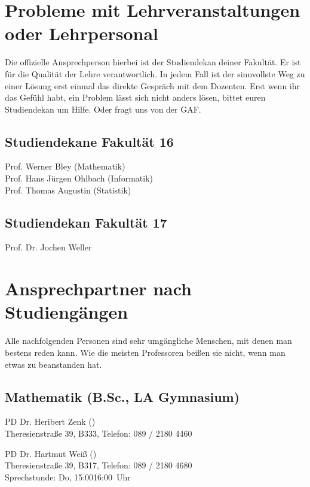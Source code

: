 \newpage %

\section{Probleme mit Lehrveranstaltungen oder Lehrpersonal}

Die offizielle Ansprechperson hierbei ist der Studiendekan deiner
Fakultät. Er ist für die Qualität der Lehre verantwortlich. In jedem
Fall ist der sinnvollste Weg zu einer Lösung erst einmal das direkte
Gespräch mit dem Dozenten. Erst wenn ihr das Gefühl habt, ein Problem
lässt sich nicht anders lösen, bittet euren Studiendekan um
Hilfe. Oder fragt uns von der GAF.

\subsection*{Studiendekane Fakultät 16}
Prof. Werner Bley (Mathematik)\subjectList{\subjectM\subjectW}\\
Prof. Hans Jürgen Ohlbach (Informatik)\subjectList{\subjectI\subjectMI}\\
Prof. Thomas Augustin (Statistik)\subjectList{\subjectS}

\subsection*{Studiendekan Fakultät 17}
Prof. Dr. Jochen Weller \subjectList{\subjectP}

\section{Ansprechpartner nach Studiengängen}

Alle nachfolgenden Personen sind sehr umgängliche Menschen, mit denen
man bestens reden kann. Wie die meisten Professoren beißen sie nicht,
wenn man etwas zu beanstanden hat.

\subsection*{Mathematik (B.Sc., LA Gymnasium)\subjectList{\subjectM}}
PD Dr. Heribert Zenk ()\\
Theresienstraße 39, B333, Telefon: 089 / 2180 \emd{} 4460

PD Dr. Hartmut Weiß ()\\
Theresienstraße 39, B317, Telefon: 089 / 2180 \emd{} 4680\\
Sprechstunde: Do, 15:00\emd{}16:00~Uhr

